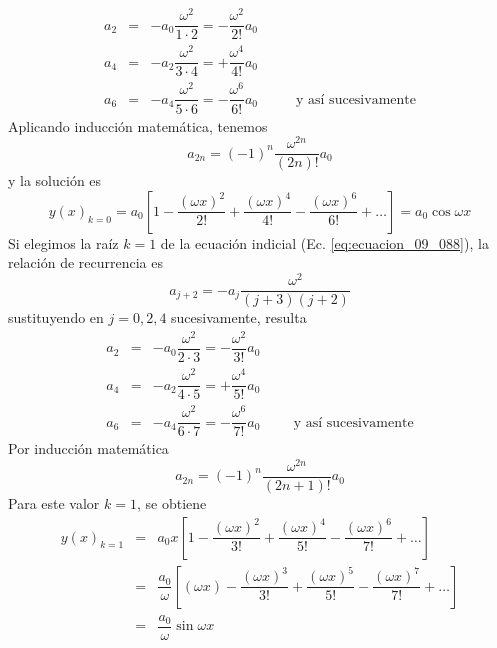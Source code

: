 \begin{eqnarray*}
a_{2} &=& - a_{0} \dfrac{\omega^{2}}{1 \cdot 2} = - \dfrac{\omega^{2}}{2!} a_{0} \nonumber \\
a_{4} &=& - a_{2} \dfrac{\omega^{2}}{3 \cdot 4} = + \dfrac{\omega^{4}}{4!} a_{0} \nonumber \\
a_{6} &=& - a_{4} \dfrac{\omega^{2}}{5 \cdot 6} = - \dfrac{\omega^{6}}{6!} a_{0} \nonumber \hspace{1cm} \mbox{ y así sucesivamente}
\end{eqnarray*}
Aplicando inducción matemática, tenemos
\begin{equation}
a_{2n} = (-1)^{n} \dfrac{\omega^{2n}}{(2n)!} a_{0}
\label{eq:ecuacion_09_090}
\end{equation}
y la solución es
\begin{equation}
y(x)_{k=0} = a_{0} \left[ 1 - \dfrac{(\omega x)^{2}}{2!} + \dfrac{(\omega x)^{4}}{4!} - \dfrac{(\omega x)^{6}}{6!} + \ldots \right] = a_{0} \cos \omega x
\label{eq:ecuacion_09_091}  
\end{equation}
Si elegimos la raíz $k=1$ de la ecuación indicial (Ec. \ref{eq:ecuacion_09_088}), la relación de recurrencia es
\begin{equation}
a_{j+2} = - a_{j} \dfrac{\omega^{2}}{(j+3)(j+2)}
\label{eq:ecuacion_09_092}
\end{equation}
sustituyendo en $j=0,2,4$ sucesivamente, resulta
\begin{eqnarray*}
a_{2} &=& - a_{0} \dfrac{\omega^{2}}{2 \cdot 3} = - \dfrac{\omega^{2}}{3!} a_{0} \nonumber \\
a_{4} &=& - a_{2} \dfrac{\omega^{2}}{4 \cdot 5} = + \dfrac{\omega^{4}}{5!} a_{0} \nonumber \\
a_{6} &=& - a_{4} \dfrac{\omega^{2}}{6 \cdot 7} = - \dfrac{\omega^{6}}{7!} a_{0} \nonumber \hspace{1cm} \mbox{y así sucesivamente}
\end{eqnarray*}
Por inducción matemática
\begin{equation}
a_{2n} = (-1)^{n} \dfrac{\omega^{2n}}{(2n+1)!} a_{0}
\label{eq:ecuacion_09_093}
\end{equation}
Para este valor $k=1$, se obtiene
\begin{eqnarray}
y(x)_{k=1} &=& a_{0} x \left[ 1 - \dfrac{(\omega x)^{2}}{3!} + \dfrac{(\omega x)^{4}}{5!} - \dfrac{(\omega x)^{6}}{7!} + \ldots \right] \nonumber \\
&=& \dfrac{a_{0}}{\omega}  \left[ (\omega x) - \dfrac{(\omega x)^{3}}{3!} + \dfrac{(\omega x)^{5}}{5!} - \dfrac{(\omega x)^{7}}{7!} + \ldots \right] \nonumber \\
&=& \dfrac{a_{0}}{\omega} \sin \omega x
\label{eq:ecuacion_09_094}
\end{eqnarray}
